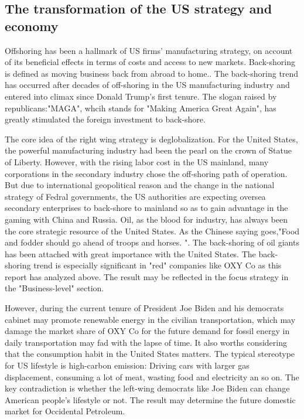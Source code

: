 \documentclass[
	a4paper, %
	12pt,%
]{CSSullivanBusinessReport}
\begin{document}
\begin{fullwidth}
\subsection{The transformation of the US strategy and economy}
Offshoring has been a hallmark of US firms’ manufacturing strategy, on account of its beneficial effects in terms of costs and access to new markets.\cite{DIMAURO2022102006}
Back-shoring is defined as moving business back from abroad to home.\cite{backshoring}. The back-shoring trend has occurred after decades of off-shoring in the US manufacturing industry and entered into climax since Donald Trump's first tenure. The slogan raised by republicans:"MAGA", whcih stands for "Making America Great Again", has greatly stimulated the foreign investment to back-shore. 
\par
The core idea of the right wing strategy is deglobalization. For the United States, the powerful manufacturing industry had been the pearl on the crown of Statue of Liberty. However, with the rising labor cost in the US mainland, many corporations in the secondary industry chose the off-shoring path of operation. But due to international geopolitical reason and the change in the national strategy of Fedral governments, the US authorities are expecting oversea secondary enterprises to back-shore to mainland so as to gain advantage in the gaming with China and Russia. Oil, as the blood for industry, has always been the core strategic resource of the United States. As the Chinese saying goes,"Food and fodder should go ahead of troops and horses.
". The back-shoring of oil giants has been attached with great importance with the United States. The back-shoring trend is especially significant in "red" companies like OXY Co as this report has analyzed above. The result may be reflected in the focus strategy in the "Business-level" section.
\par
However, during the current tenure of President Joe Biden and his democrats cabinet may promote renewable energy in the civilian transportation, which may damage the market share of OXY Co for the future demand for fossil energy in daily transportation may fad with the lapse of time. It also worths considering that the consumption habit in the United States matters. The typical stereotype for US lifestyle is high-carbon emission: Driving cars with larger gas displacement, consuming a lot of meat, wasting food and electricity an so on. The key contradiction is whether the left-wing democrats like Joe Biden can change American people's lifestyle or not. The result may determine the future domestic market for Occidental Petroleum.


\end{fullwidth}
\end{document}
